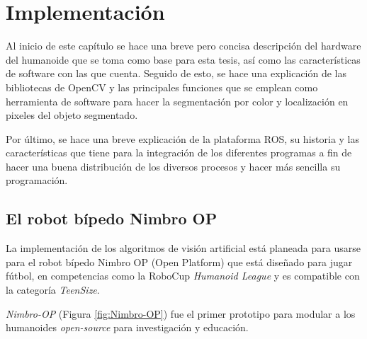 \chapter{Implementación}

	Al inicio de este capítulo se hace una breve pero concisa descripción del hardware del humanoide que se toma como base para esta tesis, así como las características de software con las que cuenta. Seguido de esto, se hace una explicación de las bibliotecas de OpenCV y las principales funciones que se emplean como herramienta de software para hacer la segmentación por color y localización en pixeles del objeto segmentado.
	
	Por último, se hace una breve explicación de la plataforma ROS, su historia y las características que tiene para la integración de los diferentes programas a fin de hacer una buena distribución de los diversos procesos y hacer más sencilla su programación.
	
	\section{El robot bípedo Nimbro OP}
	La implementación de los algoritmos de visión artificial está planeada para usarse para el robot bípedo Nimbro OP (Open Platform) que está diseñado para jugar fútbol, en competencias como la RoboCup \textit{Humanoid League} y es compatible con la categoría \textit{TeenSize}.

	\textit{Nimbro-OP} (Figura \ref{fig:Nimbro-OP}) fue el primer prototipo para modular a los humanoides \textit{open-source} para investigación y educación. 
